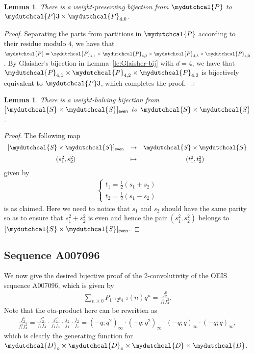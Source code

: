 \documentclass[12pt,reqno]{amsart}
\numberwithin{equation}{section}
\theoremstyle{plain}
\newtheorem{lemma}[theorem]{Lemma}
\theoremstyle{definition}
\theoremstyle{named}
\newcommand{\cP}{\mydutchcal{P}}
\newcommand{\cD}{\mydutchcal{D}}
\newcommand{\cS}{\mydutchcal{S}}
\newcommand{\even}{\mathsf{even}}
\begin{document}
\begin{lemma}\label{lemma:splitP}
	There is a weight-preserving bijection from $\cP$ to $\cP3 \times \cP_{4,0}$.
\end{lemma}

\begin{proof}
	Separating the parts from partitions in $\cP$ according to their residue modulo $4$, we have that $\cP = \cP_{4,1} \times \cP_{4,2} \times\cP_{4,3} \times\cP_{4,0}$. By Glaisher's bijection in Lemma~\ref{le:Glaisher-bij} with $d=4$, we have that $\cP_{4,1} \times \cP_{4,2} \times\cP_{4,3}$ is bijectively equivalent to $\cP3$, which completes the proof.
\end{proof}

\begin{lemma}\label{lemma:sstt}
	There is a weight-halving bijection from $[\cS\times \cS]_\even$ to $\cS\times \cS$.
\end{lemma}

\begin{proof}
	The following map
	\begin{align*}
		\begin{array}{ccc}
			[\cS\times \cS]_\even & \to & \cS\times \cS\\[6pt]
			(s_1^2,s_2^2) & \mapsto & (t_1^2,t_2^2)
		\end{array}
	\end{align*}
	given by
	\begin{align*}
		\begin{cases}
			t_1=\frac{1}{2}(s_1+s_2)\\
			t_2=\frac{1}{2}(s_1-s_2)
		\end{cases}
	\end{align*}
	is as claimed. Here we need to notice that $s_1$ and $s_2$ should have the same parity so as to ensure that $s_1^2+s_2^2$ is even and hence the pair $(s_1^2,s_2^2)$ belongs to $[\cS\times \cS]_\even$.
\end{proof}

\subsection{Sequence A007096}

We now give the desired bijective proof of the $2$-convolutivity of the OEIS sequence A007096, which is given by
\begin{align*}
	\sum_{n\ge 0} P_{1^{-4} 2^6 4^{-2}}(n) q^n = \frac{f_2^6}{f_1^4 f_4^2}.
\end{align*}
Note that the eta-product here can be rewritten as
\begin{align*}
	\frac{f_2^6}{f_1^4 f_4^2} = \frac{f_2^2}{f_1f_4} \cdot \frac{f_2^2}{f_1f_4} \cdot \frac{f_2}{f_1}\cdot \frac{f_2}{f_1} = (-q;q^2)_\infty\cdot  (-q;q^2)_\infty\cdot  (-q;q)_\infty\cdot  (-q;q)_\infty,
\end{align*}
which is clearly the generating function for $\cD_{o} \times \cD_{o} \times \cD \times \cD$.
\end{document}
